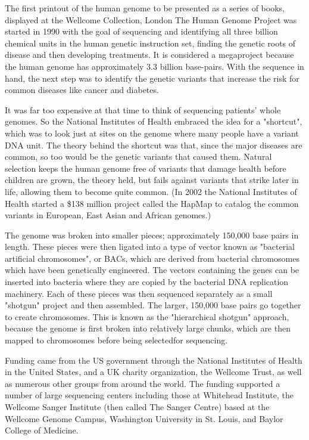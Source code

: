 \documentclass[12pt]{article}
\begin{document}
The first printout of the human genome to be presented as a series of books, displayed at the Wellcome Collection, London
The Human Genome Project was started in 1990 with the goal of sequencing and identifying all three billion chemical units in the human genetic instruction set, finding the genetic roots of disease and then developing treatments. It is considered a megaproject because the human genome has approximately 3.3 billion base-pairs. With the sequence in hand, the next step was to identify the genetic variants that increase the risk for common diseases like cancer and diabetes.

It was far too expensive at that time to think of sequencing patients’ whole genomes. So the National Institutes of Health embraced the idea for a "shortcut", which was to look just at sites on the genome where many people have a variant DNA unit. The theory behind the shortcut was that, since the major diseases are common, so too would be the genetic variants that caused them. Natural selection keeps the human genome free of variants that damage health before children are grown, the theory held, but fails against variants that strike later in life, allowing them to become quite common. (In 2002 the National Institutes of Health started a \$138 million project called the HapMap to catalog the common variants in European, East Asian and African genomes.)

The genome was broken into smaller pieces; approximately 150,000 base pairs in length. These pieces were then ligated into a type of vector known as "bacterial artificial chromosomes", or BACs, which are derived from bacterial chromosomes which have been genetically engineered. The vectors containing the genes can be inserted into bacteria where they are copied by the bacterial DNA replication machinery. Each of these pieces was then sequenced separately as a small "shotgun" project and then assembled. The larger, 150,000 base pairs go together to create chromosomes. This is known as the "hierarchical shotgun" approach, because the genome is first broken into relatively large chunks, which are then mapped to chromosomes before being selectedfor sequencing.

Funding came from the US government through the National Institutes of Health in the United States, and a UK charity organization, the Wellcome Trust, as well as numerous other groups from around the world. The funding supported a number of large sequencing centers including those at Whitehead Institute, the Wellcome Sanger Institute (then called The Sanger Centre) based at the Wellcome Genome Campus, Washington University in St. Louis, and Baylor College of Medicine.
\end{document}
